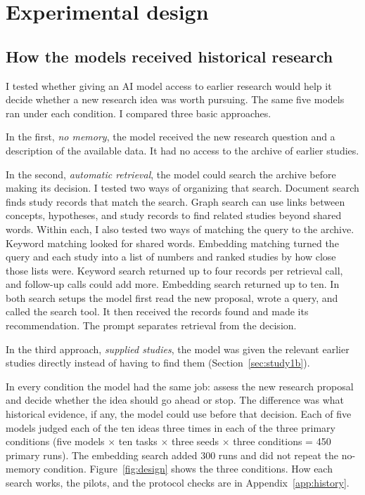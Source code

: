 \documentclass[11pt]{article}
\begin{document}
\section{Experimental design}
\label{sec:design}

\subsection{How the models received historical research}

I tested whether giving an AI model access to earlier research would help it decide whether a new research idea was worth pursuing. The same five models ran under each condition. I compared three basic approaches.

In the first, \emph{no memory}, the model received the new research question and a description of the available data. It had no access to the archive of earlier studies.

In the second, \emph{automatic retrieval}, the model could search the archive before making its decision. I tested two ways of organizing that search. Document search finds study records that match the search. Graph search can use links between concepts, hypotheses, and study records to find related studies beyond shared words. Within each, I also tested two ways of matching the query to the archive. Keyword matching looked for shared words. Embedding matching turned the query and each study into a list of numbers and ranked studies by how close those lists were. Keyword search returned up to four records per retrieval call, and follow-up calls could add more. Embedding search returned up to ten. In both search setups the model first read the new proposal, wrote a query, and called the search tool. It then received the records found and made its recommendation. The prompt separates retrieval from the decision.

In the third approach, \emph{supplied studies}, the model was given the relevant earlier studies directly instead of having to find them (Section~\ref{sec:study1b}).

In every condition the model had the same job: assess the new research proposal and decide whether the idea should go ahead or stop. The difference was what historical evidence, if any, the model could use before that decision. Each of five models judged each of the ten ideas three times in each of the three primary conditions (five models $\times$ ten tasks $\times$ three seeds $\times$ three conditions = 450 primary runs). The embedding search added 300 runs and did not repeat the no-memory condition. Figure~\ref{fig:design} shows the three conditions. How each search works, the pilots, and the protocol checks are in Appendix~\ref{app:history}.
\end{document}
